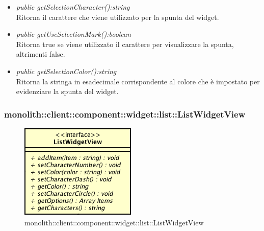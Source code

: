 \begin{itemize}
\begin{itemize}
\begin{itemize}
		\end{itemize} 
	\item \textit{public getSelectionCharacter():string}\\
	Ritorna il carattere che viene utilizzato per la spunta del widget.
	\item \textit{public getUseSelectionMark():boolean}\\
	Ritorna true se viene utilizzato il carattere per visualizzare la spunta, altrimenti false.
	\item \textit{public getSelectionColor():string}\\
	Ritorna la stringa in esadecimale corrispondente al colore che è impostato per evidenziare la spunta del widget.
	\end{itemize}
\end{itemize}

\subsubsection{monolith::client::component::widget::list::ListWidgetView}

\label{monolith::client::component::widget::list::ListWidgetView}
\begin{figure}[H]
	\centering
	\includegraphics[scale=0.5]{Sezioni/SottosezioniST/img/ListWidgetView.png}
	\caption{monolith::client::component::widget::list::ListWidgetView}
\end{figure}


